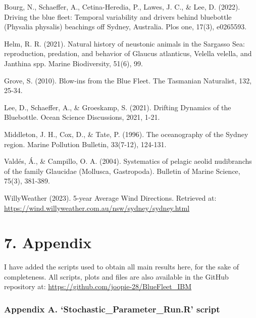 \documentclass[
]{article}
\begin{document}
Bourg, N., Schaeffer, A., Cetina-Heredia, P., Lawes, J. C., \& Lee, D.
(2022). Driving the blue fleet: Temporal variability and drivers behind
bluebottle (Physalia physalis) beachings off Sydney, Australia. Plos
one, 17(3), e0265593.

Helm, R. R. (2021). Natural history of neustonic animals in the Sargasso
Sea: reproduction, predation, and behavior of Glaucus atlanticus,
Velella velella, and Janthina spp. Marine Biodiversity, 51(6), 99.

Grove, S. (2010). Blow-ins from the Blue Fleet. The Tasmanian
Naturalist, 132, 25-34.

Lee, D., Schaeffer, A., \& Groeskamp, S. (2021). Drifting Dynamics of
the Bluebottle. Ocean Science Discussions, 2021, 1-21.

Middleton, J. H., Cox, D., \& Tate, P. (1996). The oceanography of the
Sydney region. Marine Pollution Bulletin, 33(7-12), 124-131.

Valdés, Á., \& Campillo, O. A. (2004). Systematics of pelagic aeolid
nudibranchs of the family Glaucidae (Mollusca, Gastropoda). Bulletin of
Marine Science, 75(3), 381-389.

WillyWeather (2023). 5-year Average Wind Directions. Retrieved at:
\url{https://wind.willyweather.com.au/nsw/sydney/sydney.html}

\hypertarget{appendix}{%
\section{7. Appendix}\label{appendix}}

I have added the scripts used to obtain all main results here, for the
sake of completeness. All scripts, plots and files are also available in
the GitHub repository at:
\url{https://github.com/joopie-28/BlueFleet_IBM}

\hypertarget{appendix-a.-stochastic_parameter_run.r-script}{%
\subsubsection{Appendix A. `Stochastic\_Parameter\_Run.R'
script}\label{appendix-a.-stochastic_parameter_run.r-script}}
\end{document}
